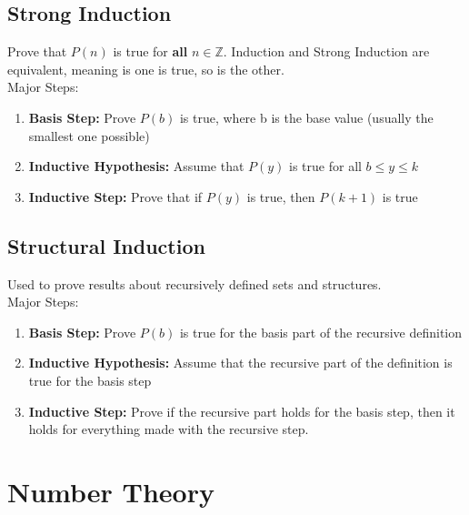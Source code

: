 \documentclass[letter]{article}
\begin{document}
\begin{multicols}{2}
	\subsection{Strong Induction}
	Prove that $P(n)$ is true for \textbf{all} $n \in \mathbb{Z}$. Induction 
	and Strong Induction are
	equivalent, meaning is one is true, so is the other.\\
	Major Steps:
	\begin{enumerate}
		\item \textbf{Basis Step:} Prove $P(b)$ is true, where b is the base 
		value (usually the smallest one possible)
		\item \textbf{Inductive Hypothesis:} Assume that $P(y)$ is true for 
		all $b \leq y \leq k$
		\item \textbf{Inductive Step:} Prove that if $P(y)$ is true, then 
		$P(k + 1)$ is true
	\end{enumerate}

	\subsection{Structural Induction}
	Used to prove results about recursively defined sets and structures.\\
	Major Steps:
	\begin{enumerate}
		\item \textbf{Basis Step:} Prove $P(b)$ is true for the basis part of the 
		recursive definition
		\item \textbf{Inductive Hypothesis:} Assume that the recursive part of the 
		definition is true for the basis step
		\item \textbf{Inductive Step:} Prove if the recursive part holds for the 
		basis step, then it holds for everything made with the recursive step.
	\end{enumerate}

	\section{Number Theory}


\end{multicols}
\end{document}
